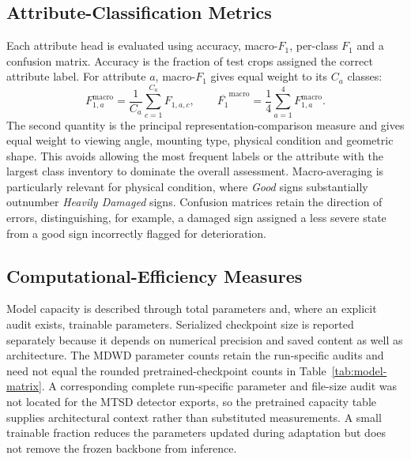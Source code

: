 \subsection{Attribute-Classification Metrics}
\label{sec:ev-attribute-metrics}
Each attribute head is evaluated using accuracy, macro-\(F_1\), per-class \(F_1\) and a confusion matrix. Accuracy is the fraction of test crops assigned the correct attribute label. For attribute \(a\), macro-\(F_1\) gives equal weight to its \(C_a\) classes:
\begin{equation}
F_{1,a}^{\mathrm{macro}}=\frac{1}{C_a}\sum_{c=1}^{C_a}F_{1,a,c},\qquad
\overline{F_1}^{\mathrm{macro}}=\frac{1}{4}\sum_{a=1}^{4}F_{1,a}^{\mathrm{macro}}.
\end{equation}
\noindent The second quantity is the principal representation-comparison measure and gives equal weight to viewing angle, mounting type, physical condition and geometric shape. This avoids allowing the most frequent labels or the attribute with the largest class inventory to dominate the overall assessment. Macro-averaging is particularly relevant for physical condition, where \emph{Good} signs substantially outnumber \emph{Heavily Damaged} signs. Confusion matrices retain the direction of errors, distinguishing, for example, a damaged sign assigned a less severe state from a good sign incorrectly flagged for deterioration.

\subsection{Computational-Efficiency Measures}
\label{sec:ev-efficiency-measures}
Model capacity is described through total parameters and, where an explicit audit exists, trainable parameters. Serialized checkpoint size is reported separately because it depends on numerical precision and saved content as well as architecture. The MDWD parameter counts retain the run-specific audits and need not equal the rounded pretrained-checkpoint counts in Table~\ref{tab:model-matrix}. A corresponding complete run-specific parameter and file-size audit was not located for the MTSD detector exports, so the pretrained capacity table supplies architectural context rather than substituted measurements. A small trainable fraction reduces the parameters updated during adaptation but does not remove the frozen backbone from inference.

